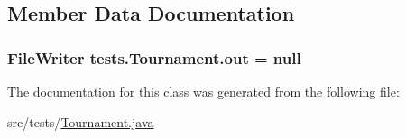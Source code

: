 \subsection{Member Data Documentation}
\hypertarget{classtests_1_1_tournament_ab48c0ee6dcae1f2631d179c4e522fede}{
\subsubsection[{out}]{\setlength{\rightskip}{0pt plus 5cm}FileWriter {\bf tests.Tournament.out} = null}}
\label{classtests_1_1_tournament_ab48c0ee6dcae1f2631d179c4e522fede}


The documentation for this class was generated from the following file:\begin{DoxyCompactItemize}
\item 
src/tests/\hyperlink{_tournament_8java}{Tournament.java}\end{DoxyCompactItemize}
